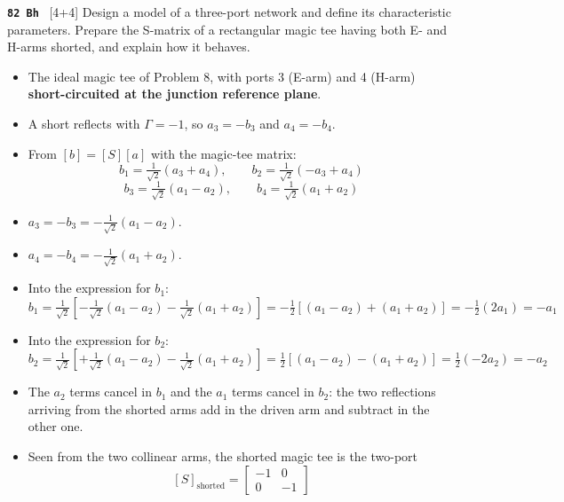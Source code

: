 \begin{asked}{\textbf{\texttt{82 Bh}} \ [4+4]}
Design a model of a three-port network and define its characteristic parameters. Prepare the S-matrix of a rectangular magic tee having both E- and H-arms shorted, and explain how it behaves.
\end{asked}
\begin{itemize}
  \item The ideal magic tee of Problem 8, with ports 3 (E-arm) and 4 (H-arm)
    \textbf{short-circuited at the junction reference plane}.
  \item A short reflects with $\Gamma = -1$, so $a_3 = -b_3$ and $a_4 = -b_4$.
\end{itemize}
\begin{itemize}
  \item From $[b] = [S][a]$ with the magic-tee matrix:
    \[ b_1 = \tfrac{1}{\sqrt{2}}(a_3 + a_4), \qquad
       b_2 = \tfrac{1}{\sqrt{2}}(-a_3 + a_4) \]
    \[ b_3 = \tfrac{1}{\sqrt{2}}(a_1 - a_2), \qquad
       b_4 = \tfrac{1}{\sqrt{2}}(a_1 + a_2) \]
\end{itemize}
\begin{itemize}
  \item $a_3 = -b_3 = -\tfrac{1}{\sqrt{2}}(a_1 - a_2)$.
  \item $a_4 = -b_4 = -\tfrac{1}{\sqrt{2}}(a_1 + a_2)$.
\end{itemize}
\begin{itemize}
  \item Into the expression for $b_1$:
    \[ b_1 = \tfrac{1}{\sqrt{2}}\left[-\tfrac{1}{\sqrt{2}}(a_1-a_2)
             - \tfrac{1}{\sqrt{2}}(a_1+a_2)\right]
           = -\tfrac{1}{2}\left[(a_1-a_2) + (a_1+a_2)\right]
           = -\tfrac{1}{2}(2a_1) = -a_1 \]
  \item Into the expression for $b_2$:
    \[ b_2 = \tfrac{1}{\sqrt{2}}\left[+\tfrac{1}{\sqrt{2}}(a_1-a_2)
             - \tfrac{1}{\sqrt{2}}(a_1+a_2)\right]
           = \tfrac{1}{2}\left[(a_1-a_2) - (a_1+a_2)\right]
           = \tfrac{1}{2}(-2a_2) = -a_2 \]
  \item The $a_2$ terms cancel in $b_1$ and the $a_1$ terms cancel in $b_2$: the two
    reflections arriving from the shorted arms add in the driven arm and subtract in the
    other one.
\end{itemize}
\begin{itemize}
  \item Seen from the two collinear arms, the shorted magic tee is the two-port
    \[ \boxed{\;[S]_{\text{shorted}} = \begin{bmatrix} -1 & 0 \\ 0 & -1 \end{bmatrix}\;} \]
\end{itemize}
